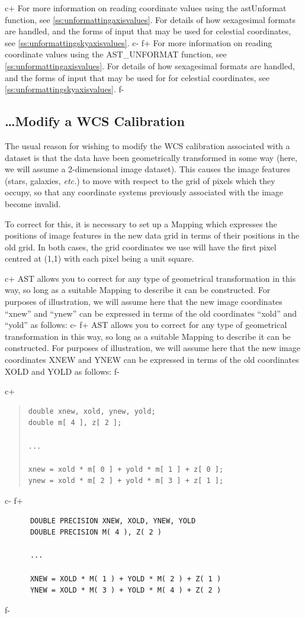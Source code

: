 \documentclass[twoside,11pt]{article}
\newcommand{\secref}[1]{\S\ref{#1}}
\renewcommand{\secref}[1]{\ref{#1}}
\begin{document}
c+
For more information on reading coordinate values using the
astUnformat function, see \secref{ss:unformattingaxisvalues}. For
details of how sexagesimal formats are handled, and the forms of input
that may be used for celestial coordinates, see
\secref{ss:unformattingskyaxisvalues}.
c-
f+
For more information on reading coordinate values using the
AST\_UNFORMAT function, see \secref{ss:unformattingaxisvalues}. For
details of how sexagesimal formats are handled, and the forms of input
that may be used for for celestial coordinates, see
\secref{ss:unformattingskyaxisvalues}.
f-

\subsection{\label{ss:howtomodifywcs}\ldots Modify a WCS Calibration}

The usual reason for wishing to modify the WCS calibration associated
with a dataset is that the data have been geometrically transformed in
some way (here, we will assume a 2-dimensional image dataset). This
causes the image features (stars, galaxies, {\em{etc.}}) to move with
respect to the grid of pixels which they occupy, so that any
coordinate systems previously associated with the image become
invalid.

To correct for this, it is necessary to set up a Mapping which
expresses the positions of image features in the new data grid in
terms of their positions in the old grid. In both cases, the grid
coordinates we use will have the first pixel centred at (1,1) with
each pixel being a unit square.

c+
AST allows you to correct for any type of geometrical transformation
in this way, so long as a suitable Mapping to describe it can be
constructed. For purposes of illustration, we will assume here that
the new image coordinates ``xnew'' and ``ynew'' can be expressed in
terms of the old coordinates ``xold'' and ``yold'' as follows:
c-
f+
AST allows you to correct for any type of geometrical transformation
in this way, so long as a suitable Mapping to describe it can be
constructed. For purposes of illustration, we will assume here that
the new image coordinates XNEW and YNEW can be expressed in terms of
the old coordinates XOLD and YOLD as follows:
f-

c+
\begin{quote}
\small
\begin{verbatim}
double xnew, xold, ynew, yold;
double m[ 4 ], z[ 2 ];

...

xnew = xold * m[ 0 ] + yold * m[ 1 ] + z[ 0 ];
ynew = xold * m[ 2 ] + yold * m[ 3 ] + z[ 1 ];
\end{verbatim}
\normalsize
\end{quote}
c-
f+
\small
\begin{verbatim}
      DOUBLE PRECISION XNEW, XOLD, YNEW, YOLD
      DOUBLE PRECISION M( 4 ), Z( 2 )

      ...

      XNEW = XOLD * M( 1 ) + YOLD * M( 2 ) + Z( 1 )
      YNEW = XOLD * M( 3 ) + YOLD * M( 4 ) + Z( 2 )
\end{verbatim}
\normalsize
f-
\end{document}
